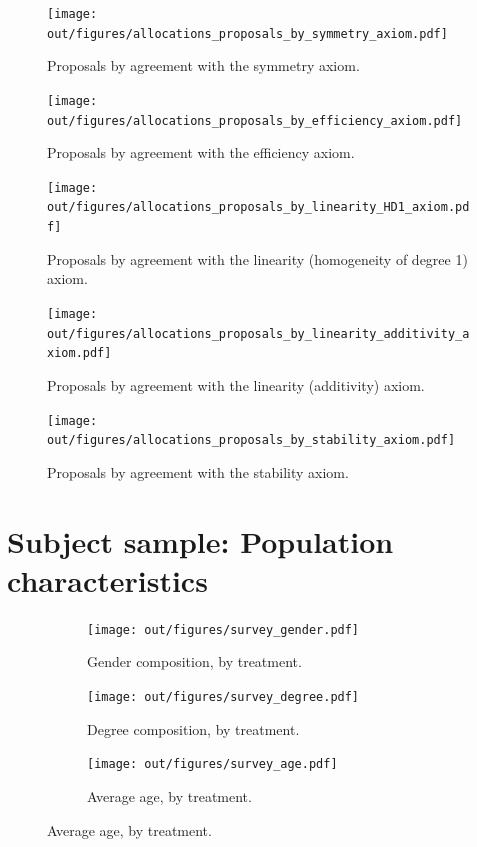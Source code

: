 \documentclass[12pt]{article}
\begin{document}
\begin{figure}
    \centering
    \texttt{[image: out/figures/allocations\_proposals\_by\_symmetry\_axiom.pdf]}
    \caption{Proposals by agreement with the symmetry axiom.}
    \label{fig:axioms_proposals_symmetry}
\end{figure}

\begin{figure}
    \centering
    \texttt{[image: out/figures/allocations\_proposals\_by\_efficiency\_axiom.pdf]}
    \caption{Proposals by agreement with the efficiency axiom.}
    \label{fig:axioms_proposals_efficiency}
\end{figure}

\begin{figure}
    \centering
    \texttt{[image: out/figures/allocations\_proposals\_by\_linearity\_HD1\_axiom.pdf]}
    \caption{Proposals by agreement with the linearity (homogeneity of degree 1) axiom.}
    \label{fig:axioms_proposals_linearity_HD1}
\end{figure}

\begin{figure}
    \centering
    \texttt{[image: out/figures/allocations\_proposals\_by\_linearity\_additivity\_axiom.pdf]}
    \caption{Proposals by agreement with the linearity (additivity) axiom.}
    \label{fig:axioms_proposals_linearity_additivity}
\end{figure}

\begin{figure}
    \centering
    \texttt{[image: out/figures/allocations\_proposals\_by\_stability\_axiom.pdf]}
    \caption{Proposals by agreement with the stability axiom.}
    \label{fig:axioms_proposals_stability}
\end{figure}

\section{Subject sample: Population characteristics} 

\begin{figure}[!h]
    \begin{subfigure}[b]{0.49\textwidth}
        \centering
        \texttt{[image: out/figures/survey\_gender.pdf]}
        \caption{Gender composition, by treatment.}
        \label{fig:balance_gender}
    \end{subfigure}
    \hfill
    \begin{subfigure}[b]{0.49\textwidth}
        \centering
        \texttt{[image: out/figures/survey\_degree.pdf]}
        \caption{Degree composition, by treatment.}
        \label{fig:balance_degree}
    \end{subfigure}
    \vfill
    \begin{subfigure}[b]{0.43\textwidth}
         \centering
        \texttt{[image: out/figures/survey\_age.pdf]}
        \caption{Average age, by treatment.}
        \label{fig:balance_age}
    \end{subfigure}
    \label{fig:balance}
\end{figure}
\end{document}
